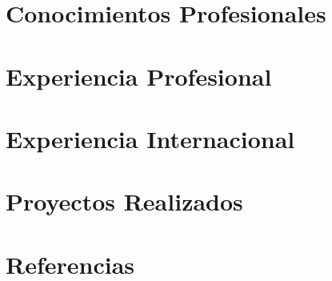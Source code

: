 \documentclass[11pt,a4paper,sans]{moderncv}
\begin{document}
\maketitle






\section{Conocimientos Profesionales}








\section{Experiencia Profesional}


\section{Experiencia Internacional}



\section{Proyectos Realizados}



\section{Referencias}

      
\end{document}
